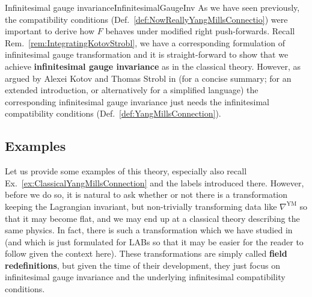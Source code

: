 \documentclass[a4paper,oneside,11pt,bibliography=totoc]{scrartcl}
\theoremstyle{plain}
\theoremstyle{remark}
\theoremstyle{definition}
\begin{document}
\begin{remarks}{Infinitesimal gauge invariance}{InfinitesimalGaugeInv}
As we have seen previously, the compatibility conditions (Def.\ \ref{def:NowReallyYangMillsConnectio}) were important to derive how $F$ behaves under modified right push-forwards. Recall Rem.\ \ref{rem:IntegratingKotovStrobl}, we have a corresponding formulation of infinitesimal gauge transformation and it is straight-forward to show that we achieve \textbf{infinitesimal gauge invariance} as in the classical theory. However, as argued by Alexei Kotov and Thomas Strobl in \cite{CurvedYMH} (for a concise summary; \cite{MyThesis} for an extended introduction, or alternatively \cite{My1stpaper} for a simplified language) the corresponding infinitesimal gauge invariance just needs the infinitesimal compatibility conditions (Def.\ \ref{def:YangMillsConnection}).
\end{remarks}

\subsection{Examples}\label{CYMExamples}

Let us provide some examples of this theory, especially also recall Ex.\ \ref{ex:ClassicalYangMillsConnection} and the labels introduced there. However, before we do so, it is natural to ask whether or not there is a transformation keeping the Lagrangian invariant, but non-trivially transforming data like $\nabla^{\mathrm{YM}}$ so that it may become flat, and we may end up at a classical theory describing the same physics. In fact, there is such a transformation which we have studied in \cite{MyThesis} (and \cite{My1stpaper} which is just formulated for LABs so that it may be easier for the reader to follow given the context here). These transformations are simply called \textbf{field redefinitions}, but given the time of their development, they just focus on infinitesimal gauge invariance and the underlying infinitesimal compatibility conditions.
\end{document}
